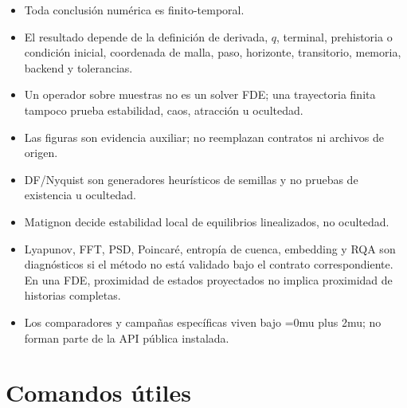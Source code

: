 \documentclass[11pt]{article}
\DeclareRobustCommand{\codepath}[1]{\begingroup\Urlmuskip=0mu plus 2mu\path{#1}\endgroup}
\begin{document}
\begin{itemize}
  \item Toda conclusión numérica es finito-temporal.
  \item El resultado depende de la definición de derivada, \(q\), terminal,
  prehistoria o condición inicial, coordenada de malla, paso, horizonte,
  transitorio, memoria, backend y tolerancias.
  \item Un operador sobre muestras no es un solver FDE; una trayectoria finita
  tampoco prueba estabilidad, caos, atracción u ocultedad.
  \item Las figuras son evidencia auxiliar; no reemplazan contratos ni
  archivos de origen.
  \item DF/Nyquist son generadores heurísticos de semillas y no pruebas de existencia u ocultedad.
  \item Matignon decide estabilidad local de equilibrios linealizados, no
  ocultedad.
  \item Lyapunov, FFT, PSD, Poincaré, entropía de cuenca, embedding y RQA son
  diagnósticos si el método no está validado bajo el contrato correspondiente.
  En una FDE, proximidad de estados proyectados no implica proximidad de
  historias completas.
  \item Los comparadores y campañas específicas viven bajo
  \codepath{validation/}; no forman parte de la API pública instalada.
\end{itemize}

\appendix

\section{Comandos útiles}
\end{document}
